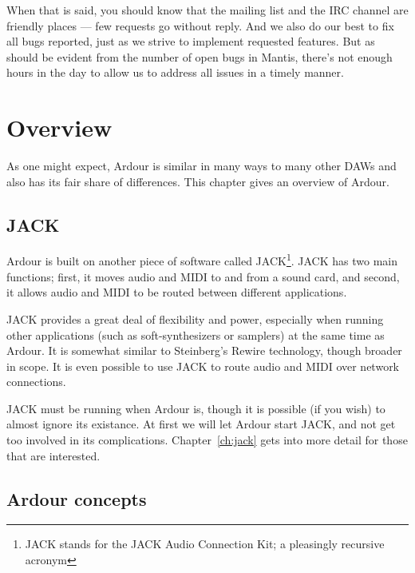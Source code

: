 \documentclass[10pt,a4paper]{book}
\begin{document}
When that is said, you should know that the mailing list and the IRC
channel are friendly places --- few requests go without reply. And we
also do our best to fix all bugs reported, just as we strive to
implement requested features. But as should be evident from the number
of open bugs in Mantis, there's not enough hours in the day to allow
us to address all issues in a timely manner.






\chapter{Overview}

As one might expect, Ardour is similar in many ways to many other DAWs
and also has its fair share of differences.  This chapter gives an
overview of Ardour.


\section{JACK}

Ardour is built on another piece of software called JACK\footnote{JACK
  stands for the JACK Audio Connection Kit; a pleasingly recursive acronym}.
JACK has two main functions; first, it moves audio and MIDI to
and from a sound card, and second, it allows audio and MIDI to be
routed between different applications.

JACK provides a great deal of flexibility and power, especially when
running other applications (such as soft-synthesizers or samplers) at
the same time as Ardour.  It is somewhat similar to Steinberg's Rewire
technology, though broader in scope.  It is even possible to use JACK
to route audio and MIDI over network connections.

JACK must be running when Ardour is, though it is possible (if you
wish) to almost ignore its existance.  At first we will let Ardour
start JACK, and not get too involved in its complications.
Chapter~\ref{ch:jack} gets into more detail for those that are
interested.


\section{Ardour concepts}
\end{document}
